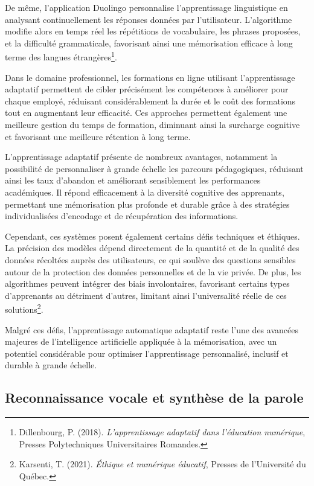 \documentclass[12pt,a4paper]{report}
\begin{document}
De même, l'application Duolingo personnalise l’apprentissage linguistique en analysant continuellement les réponses données par l’utilisateur. L’algorithme modifie alors en temps réel les répétitions de vocabulaire, les phrases proposées, et la difficulté grammaticale, favorisant ainsi une mémorisation efficace à long terme des langues étrangères\footnote{Dillenbourg, P. (2018). \textit{L'apprentissage adaptatif dans l’éducation numérique}, Presses Polytechniques Universitaires Romandes.}.

Dans le domaine professionnel, les formations en ligne utilisant l’apprentissage adaptatif permettent de cibler précisément les compétences à améliorer pour chaque employé, réduisant considérablement la durée et le coût des formations tout en augmentant leur efficacité. Ces approches permettent également une meilleure gestion du temps de formation, diminuant ainsi la surcharge cognitive et favorisant une meilleure rétention à long terme.

L’apprentissage adaptatif présente de nombreux avantages, notamment la possibilité de personnaliser à grande échelle les parcours pédagogiques, réduisant ainsi les taux d’abandon et améliorant sensiblement les performances académiques. Il répond efficacement à la diversité cognitive des apprenants, permettant une mémorisation plus profonde et durable grâce à des stratégies individualisées d'encodage et de récupération des informations.

Cependant, ces systèmes posent également certains défis techniques et éthiques. La précision des modèles dépend directement de la quantité et de la qualité des données récoltées auprès des utilisateurs, ce qui soulève des questions sensibles autour de la protection des données personnelles et de la vie privée. De plus, les algorithmes peuvent intégrer des biais involontaires, favorisant certains types d'apprenants au détriment d’autres, limitant ainsi l'universalité réelle de ces solutions\footnote{Karsenti, T. (2021). \textit{Éthique et numérique éducatif}, Presses de l’Université du Québec.}.

Malgré ces défis, l’apprentissage automatique adaptatif reste l'une des avancées majeures de l’intelligence artificielle appliquée à la mémorisation, avec un potentiel considérable pour optimiser l’apprentissage personnalisé, inclusif et durable à grande échelle.

\subsection{Reconnaissance vocale et synthèse de la parole}
\end{document}
